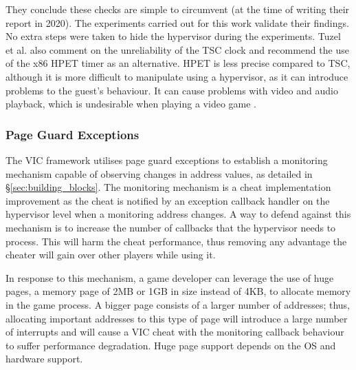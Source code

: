  They conclude these checks are simple to circumvent (at the time of writing their report in 2020). The experiments carried out for this work validate their findings. No extra steps were taken to hide the hypervisor during the experiments. Tuzel et al. \cite{whoWatchesTheWatcher} also comment on the unreliability of the TSC clock and recommend the use of the x86 HPET timer as an alternative. HPET is less precise compared to TSC, although it is more difficult to manipulate using a hypervisor, as it can introduce problems to the guest's behaviour. It can cause problems with video and audio playback, which is undesirable when playing a video game \cite{intelHPET}.

 \subsubsection{\textbf{Page Guard Exceptions}}
The VIC framework utilises page guard exceptions to establish a monitoring mechanism capable of observing changes in address values, as detailed in \S \ref{sec:building_blocks}. The monitoring mechanism is a cheat implementation improvement as the cheat is notified by an exception callback handler on the hypervisor level when a monitoring address changes. A way to defend against this mechanism is to increase the number of callbacks that the hypervisor needs to process. This will harm the cheat performance, thus removing any advantage the cheater will gain over other players while using it.  

In response to this mechanism, a game developer can leverage the use of huge pages, a memory page of 2MB or 1GB in size instead of 4KB, to allocate memory in the game process. A bigger page consists of a larger number of addresses; thus, allocating important addresses to this type of page will introduce a large number of interrupts and will cause a VIC cheat with the monitoring callback behaviour to suffer performance degradation. Huge page support depends on the OS and hardware support.


